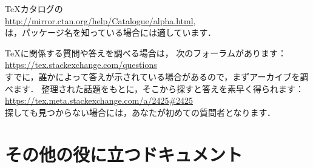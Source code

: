 \TeX{}カタログの\\
\null\hspace{2\parindent}
\url{http://mirror.ctan.org/help/Catalogue/alpha.html},\\
は，パッケージ名を知っている場合には適しています．

\medskip
\TeX{}に関係する質問や答えを調べる場合は，
次のフォーラムがあります：\\
\null\hspace{2\parindent}
\url{https://tex.stackexchange.com/questions}\\
すでに，誰かによって答えが示されている場合があるので，まずアーカイブを調べます．
整理された話題をもとに，そこから探すと答えを素早く得られます：\\
\null\hspace{2\parindent}
\url{https://tex.meta.stackexchange.com/a/2425#2425}\\
探しても見つからない場合には，あなたが初めての質問者となります．



\section{その他の役に立つドキュメント}

